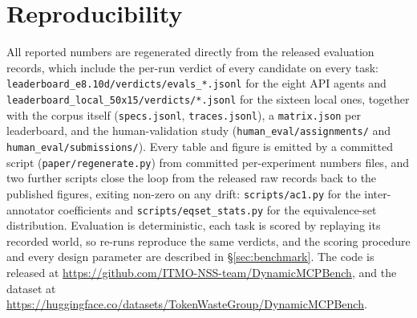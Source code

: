 \section{Reproducibility}
\label{app:reproducibility}
All reported numbers are regenerated directly from the released evaluation
records, which include the per-run verdict of every candidate on every task:
\texttt{leaderboard\_e8.10d/verdicts/evals\_*.jsonl} for the eight API agents
and \texttt{leaderboard\_local\_50x15/verdicts/*.jsonl} for the sixteen local
ones, together with the corpus itself (\texttt{specs.jsonl},
\texttt{traces.jsonl}), a \texttt{matrix.json} per leaderboard, and the
human-validation study (\texttt{human\_eval/assignments/} and
\texttt{human\_eval/submissions/}). Every table and figure is emitted by a
committed script (\texttt{paper/regenerate.py}) from committed per-experiment
numbers files, and two further scripts close the loop from the released raw
records back to the published figures, exiting non-zero on any drift:
\texttt{scripts/ac1.py} for the inter-annotator coefficients and
\texttt{scripts/eqset\_stats.py} for the equivalence-set distribution.
Evaluation is deterministic, each task is scored by replaying its recorded
world, so re-runs reproduce the same verdicts, and the scoring procedure and
every design parameter are described in \S\ref{sec:benchmark}. The code is
released at
\url{https://github.com/ITMO-NSS-team/DynamicMCPBench}, and the dataset at
\url{https://huggingface.co/datasets/TokenWasteGroup/DynamicMCPBench}.
